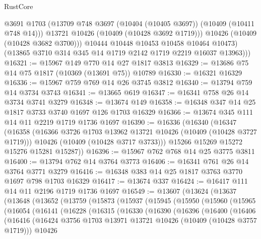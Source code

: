 \begin{lexlean}{RustCore}
\begin{coremodule}
              @3691
              @1703
              (@13709 @748 @3697 (@10404 (@10405 @3697)) (@10409 (@10411 @748 @14)))
              @13721
              @10426
              (@10409 (@10428 @3692 @1719)))
            @10426
            (@10409 (@10428 @3682 @3700)))
          @10444
          @10448
          @10453
          @10458
          @10464
          @10473)
        (@13865 @3710 @314 @345 @14 @1719 @2142 @1719 @2219 @16037 @13963)))
@16321 := @15967 @149 @770 @14 @27 @1817 @3813
@16329 := @13686 @75 @14 @75 @1817 (@10369 (@13691 @75)) @10789
@16330 := @16321 @16329
@16336 := @15967 @759 @769 @14 @26 @3745 @3812
@16340 := @13794 @759 @14 @3734 @3743
@16341 := @13665 @619
@16347 := @16341 @758 @26 @14 @3734 @3741 @3279
@16348 := @13674 @149
@16358 := @16348 @347 @14 @25 @1817 @3733 @3740 @1697 @126 @1703 @16329
@16366 := @13674 @345 @111 @14 @11 @2219 @1719 @1736 @1697
@16390 := @16336
    (@16340
      (@16347
        (@16358
          (@16366 @3726 @1703 @13962 @13721 @10426 (@10409 (@10428 @3727 @1719)))
          @10426
          (@10409 (@10428 @3717 @3733)))
        @15266
        @15269
        @15272
        @15276
        @15281
        @15287))
@16396 := @15967 @762 @768 @14 @25 @3775 @3811
@16400 := @13794 @762 @14 @3764 @3773
@16406 := @16341 @761 @26 @14 @3764 @3771 @3279
@16416 := @16348 @383 @14 @25 @1817 @3763 @3770 @1697 @798 @1703 @16329
@16417 := @13674 @337
@16424 := @16417 @111 @14 @11 @2196 @1719 @1736 @1697
@16549 := @13607
    (@13624
      (@13637
        (@13648
          (@13652
            (@13759
              (@15873
                (@15937
                  (@15945
                    (@15950
                      (@15960
                        (@15965
                          (@16054
                            (@16141
                              (@16228
                                (@16315
                                  (@16330
                                    (@16390
                                      (@16396
                                        (@16400
                                          (@16406
                                            (@16416
                                              (@16424
                                                @3756
                                                @1703
                                                @13971
                                                @13721
                                                @10426
                                                (@10409 (@10428 @3757 @1719)))
                                              @10426

\end{coremodule}
\end{lexlean}
